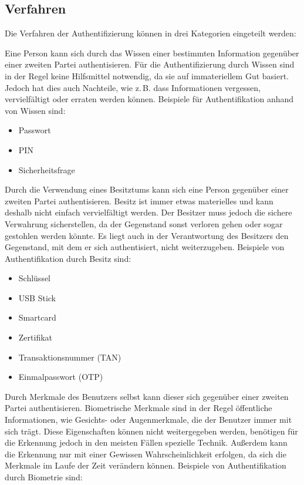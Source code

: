 \documentclass[11pt,a4paper,ngerman]{scrreprt}
\begin{document}
\subsection{Verfahren}
Die Verfahren der Authentifizierung können in drei Kategorien eingeteilt werden:
\begin{description}[font=\rmfamily]
    \item[Wissen] Eine Person kann sich durch das Wissen einer bestimmten Information gegenüber einer zweiten Partei authentisieren. Für die Authentifizierung durch Wissen sind in der Regel keine Hilfsmittel notwendig, da sie auf immateriellem Gut basiert. Jedoch hat dies auch Nachteile, wie z.\,B. dass Informationen vergessen, vervielfältigt oder erraten werden können. Beispiele für Authentifikation anhand von Wissen sind:
    \begin{itemize}
    \item Passwort
    \item PIN
    \item Sicherheitsfrage
    \end{itemize} 
    \item[Besitz] Durch die Verwendung eines Besitztums kann sich eine Person gegenüber einer zweiten Partei authentisieren. Besitz ist immer etwas materielles und kann deshalb nicht einfach vervielfältigt werden. Der Besitzer muss jedoch die sichere Verwahrung sicherstellen, da der Gegenstand sonst verloren gehen oder sogar gestohlen werden könnte. Es liegt auch in der Verantwortung des Besitzers den Gegenstand, mit dem er sich authentisiert, nicht weiterzugeben. Beispiele von Authentifikation durch Besitz sind:
    \begin{itemize}
        \item Schlüssel
        \item USB Stick
        \item Smartcard
        \item Zertifikat
        \item Transaktionsnummer (TAN)
        \item Einmalpasswort (OTP)
    \end{itemize}
    \item[Körperliches Merkmal / Biometrie] Durch Merkmale des Benutzers selbst kann dieser sich gegenüber einer zweiten Partei authentisieren. Biometrische Merkmale sind in der Regel öffentliche Informationen, wie Gesichts- oder Augenmerkmale, die der Benutzer immer mit sich trägt. Diese Eigenschaften können nicht weitergegeben werden, benötigen für die Erkennung jedoch in den meisten Fällen spezielle Technik. Außerdem kann die Erkennung nur mit einer Gewissen Wahrscheinlichkeit erfolgen, da sich die Merkmale im Laufe der Zeit verändern können. Beispiele von Authentifikation durch Biometrie sind:

\end{description}
\end{document}

